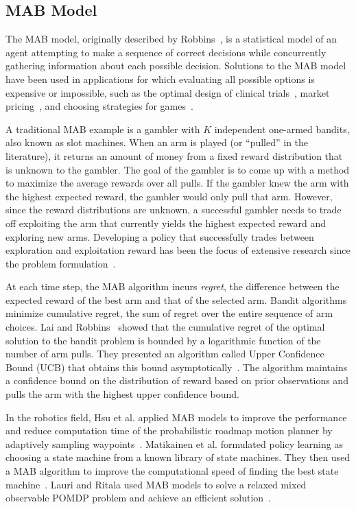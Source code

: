 \documentclass[10pt, conference]{ieeeconf}      %
\begin{document}
\subsection{MAB Model}
The MAB model, originally described by Robbins~\cite{robbins1985some}, is a statistical model of an agent attempting to make a sequence of correct decisions while concurrently gathering information about each possible decision. Solutions to the MAB model have been used in applications for which evaluating all possible options is expensive or impossible, such as the optimal design of clinical trials~\cite{simon1989optimal}, market pricing~\cite{rothschild1974two}, and choosing strategies for games~\cite{st2012online}. 

A traditional MAB example is a gambler with $K$ independent one-armed bandits, also known as slot machines.
When an arm is played (or ``pulled'' in the literature), it returns an amount of money from a fixed reward distribution that is unknown to the gambler.
The goal of the gambler is to come up with a method to maximize the average rewards over all pulls.
If the gambler knew the arm with the highest expected reward, the gambler would only pull that arm.
However, since the reward distributions are unknown, a successful gambler needs to trade off exploiting the arm that currently yields the highest expected reward and exploring new arms.
Developing a policy that successfully trades between exploration and exploitation reward has been the focus of extensive research since the problem formulation~\cite{barto1998reinforcement, robbins1985some}.

At each time step, the MAB algorithm incurs \textit{regret}, the difference between the expected reward of the best arm and that of the selected arm. Bandit algorithms minimize cumulative regret, the sum of regret over the entire sequence of arm choices.
Lai and Robbins~\cite{lai1985asymptotically} showed that the cumulative regret of the optimal solution to the bandit problem is bounded by a logarithmic function of the number of arm pulls.
They presented an algorithm called Upper Confidence Bound (UCB) that obtains this bound asymptotically~\cite{lai1985asymptotically}.
The algorithm maintains a confidence bound on the distribution of reward based on prior observations and pulls the arm with the highest upper confidence bound.


In the robotics field, Hsu et al. applied MAB models to improve the performance and reduce computation time of the
probabilistic roadmap motion planner by adaptively sampling waypoints~\cite{hsu2005hybrid}. Matikainen et al. formulated
policy learning as choosing a state machine from a known library of state machines. They then used a MAB algorithm to improve the computational speed of finding the best state machine~\cite{matikainen2013multi}. Lauri and Ritala used MAB models to solve a relaxed mixed observable POMDP problem and achieve an efficient solution~\cite{Mikko2015POMDP}.
\end{document}
